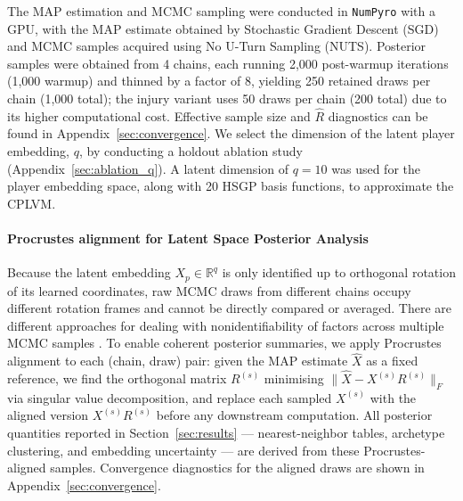 \documentclass[aoas]{imsart}
\begin{document}
The MAP estimation and MCMC sampling were conducted in \texttt{NumPyro} \citep{numpyro} with a GPU, with the MAP estimate obtained by Stochastic Gradient Descent (SGD) and MCMC samples acquired using No U-Turn Sampling (NUTS). Posterior samples were obtained from 4 chains, each running 2{,}000 post-warmup iterations (1{,}000 warmup) and thinned by a factor of 8, yielding 250 retained draws per chain (1{,}000 total); the injury variant uses 50 draws per chain (200 total) due to its higher computational cost. Effective sample size and  $\hat{R}$ diagnostics can be found in Appendix~\ref{sec:convergence}. We select the dimension of the latent player embedding, $q$, by conducting a holdout ablation study (Appendix~\ref{sec:ablation_q}).  A latent dimension of $q = 10$ was used for the player embedding space, along with 20 HSGP basis functions, to approximate the CPLVM. 

\paragraph{Procrustes alignment for Latent Space Posterior Analysis}

Because the latent embedding $X_p \in \mathbb{R}^q$ is only identified up to orthogonal rotation of its learned coordinates, raw MCMC draws from different chains occupy different rotation frames and cannot be directly compared or averaged. There are different approaches for dealing with nonidentifiability of factors across multiple MCMC samples \citep{procrustes, poworoznek2024efficientlyresolvingrotationalambiguity}. To enable coherent posterior summaries, we apply Procrustes alignment to each (chain, draw) pair: given the MAP estimate $\hat{X}$ as a fixed reference, we find the orthogonal matrix $R^{(s)}$ minimising $\|\hat{X} - X^{(s)} R^{(s)}\|_F$ via singular value decomposition, and replace each sampled $X^{(s)}$ with the aligned version $X^{(s)} R^{(s)}$ before any downstream computation.  All posterior quantities reported in Section~\ref{sec:results} --- nearest-neighbor tables, archetype clustering, and embedding uncertainty --- are derived from these Procrustes-aligned samples.  Convergence diagnostics for the aligned draws are shown in Appendix~\ref{sec:convergence}.
\end{document}
